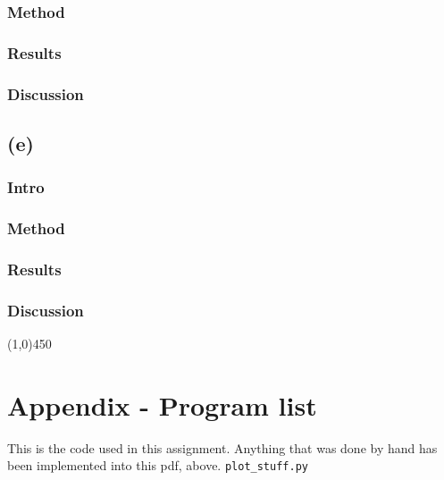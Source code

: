 \documentclass[11pt,a4paper,notitlepage]{article}
\begin{document}
\subsubsection{Method}
\subsubsection{Results}
\subsubsection{Discussion}

\subsection{(e)}
\subsubsection{Intro}
\subsubsection{Method}
\subsubsection{Results}
\subsubsection{Discussion}


\begin{center}
\line(1,0){450}
\end{center}

\newpage
\section{Appendix - Program list}
This is the code used in this assignment. Anything that was done by hand has been implemented into this pdf, above.
\lstset{style=pystyle}
\verb|plot_stuff.py|

\end{document}

